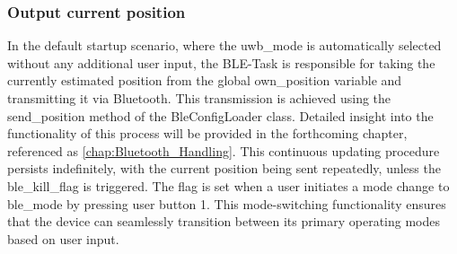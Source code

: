 \subsubsection{Output current position}
In the default startup scenario, where the uwb\_mode is automatically selected without any additional user input, the BLE-Task is responsible for taking the currently estimated position from the global own\_position variable and transmitting it via Bluetooth. 
This transmission is achieved using the send\_position method of the BleConfigLoader class. Detailed insight into the functionality of this process will be provided in the forthcoming chapter, referenced as \ref{chap:Bluetooth_Handling}.
\vspace{4pt}
\newline
This continuous updating procedure persists indefinitely, with the current position being sent repeatedly, unless the ble\_kill\_flag is triggered. 
The flag is set when a user initiates a mode change to ble\_mode by pressing user button 1.
\vspace{4pt}
\newline
This mode-switching functionality ensures that the device can seamlessly transition between its primary operating modes based on user input. 

